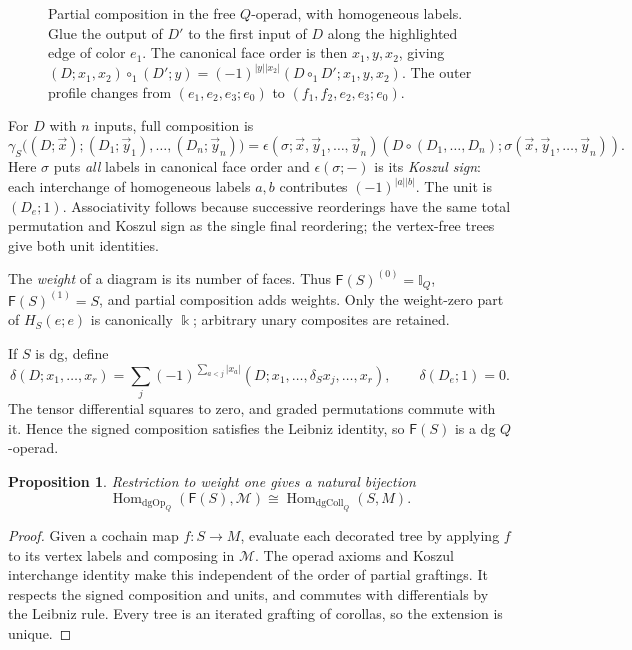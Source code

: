 \documentclass[11pt,letterpaper]{article}
\numberwithin{equation}{section}
\theoremstyle{plain}
\newtheorem{prop}[thm]{Proposition}
\theoremstyle{definition}
\theoremstyle{remark}
\begin{document}
\begin{figure}[htbp]
\centering
\scalebox{0.9}{}
\caption{Partial composition in the free $Q$-operad, with homogeneous
labels. Glue the output of $D'$ to the first input of $D$ along the
highlighted edge of color $e_1$. The canonical face order is then
$x_1,y,x_2$, giving
$(D;x_1,x_2)\circ_1(D';y)=(-1)^{|y||x_2|}(D\circ_1D';x_1,y,x_2)$.
The outer profile changes from
$(e_1,e_2,e_3;e_0)$ to $(f_1,f_2,e_2,e_3;e_0)$.}
\label{fig:free-operad-composition-draft}
\end{figure}

For $D$ with $n$ inputs, full composition is
\begin{equation*} \gamma_S\bigl((D;\vec x);(D_1;\vec y_1),\ldots,(D_n;\vec y_n)\bigr)
 =\epsilon(\sigma;\vec x,\vec y_1,\ldots,\vec y_n)
   (D\circ(D_1,\ldots,D_n);\sigma(\vec x,\vec y_1,\ldots,\vec y_n)).
\end{equation*}
Here $\sigma$ puts \emph{all} labels in canonical face order and
$\epsilon(\sigma;-)$ is its \textit{Koszul sign}: each interchange of homogeneous
labels $a,b$ contributes $(-1)^{|a||b|}$.
The unit is $(D_e;1)$. Associativity follows because successive
reorderings have the same total permutation and Koszul sign as the
single final reordering; the vertex-free trees give both unit identities.

The \textit{weight} of a diagram is its number of faces. Thus
$\mathsf F(S)^{(0)}=\mathbb I_Q$, $\mathsf F(S)^{(1)}=S$, and partial
composition adds weights. Only the weight-zero part of $H_S(e;e)$ is
canonically $\Bbbk$; arbitrary unary composites are retained.

If $S$ is dg, define
\begin{equation}\label{eq:free_diff_order}
 \delta(D;x_1,\ldots,x_r)
 =\sum_j(-1)^{\sum_{a<j}|x_a|}
 (D;x_1,\ldots,\delta_Sx_j,\ldots,x_r),\qquad\delta(D_e;1)=0.
\end{equation}
The tensor differential squares to zero, and graded permutations commute
with it. Hence the signed composition satisfies the Leibniz identity,
so $\mathsf F(S)$ is a dg $Q$-operad.

\begin{prop}\label{prop_universal_property_free_dg_Q_operad}
Restriction to weight one gives a natural bijection
\[
 \operatorname{Hom}_{\mathrm{dgOp}_Q}(\mathsf F(S),\mathscr M)
 \cong\operatorname{Hom}_{\mathrm{dgColl}_Q}(S,M).
\]
\end{prop}
\begin{proof}
Given a cochain map $f:S\to M$, evaluate each decorated tree by applying
$f$ to its vertex labels and composing in $\mathscr M$. The operad axioms
and Koszul interchange identity make this independent of the order of
partial graftings. It respects the signed composition and units, and
commutes with differentials by the Leibniz rule. Every tree is an iterated
grafting of corollas, so the extension is unique.
\end{proof}
\end{document}
